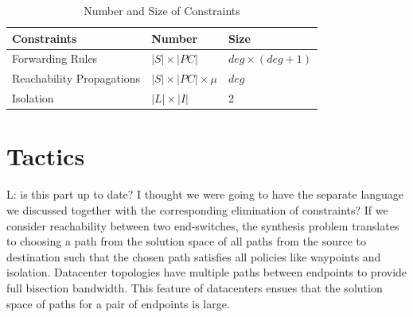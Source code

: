 \documentclass[]{sig}
\newcommand{\loris}[1]{\textcolor[rgb]{0.00,0.00,1.00}{L: #1}}
\begin{document}
\begin{table}[H]
\begin{center}
	\begin{tabular}{||m{6em} | m{7em} | m{7em} ||} 
		\hline
		Constraints & Number & Size \\ [0.5ex] 
		\hline\hline
		Forwarding Rules & $|S| \times |PC| $ & $deg \times (deg + 1)$ \\ [0.5ex] 
		\hline
		Reachability Propagations & $|S| \times |PC| \times \mu $ & $deg$ \\ [0.5ex] 
		\hline
		Isolation & $|L| \times |I|$ & 2 \\
		\hline
	\end{tabular}
\end{center}
\caption{Number and Size of Constraints} \label{tab:title} 
\end{table}

\section{Tactics} \label{sec:tactic}

\loris{is this part up to date?
I thought we were going to have the separate language we discussed
together with the corresponding elimination of constraints?
}
If we consider reachability between two end-switches, the synthesis problem translates to choosing a path from the solution space of all paths from the source to destination such that the chosen path satisfies all policies like waypoints and isolation. Datacenter topologies have multiple paths between endpoints to provide full bisection bandwidth. This feature of datacenters ensues that the solution space of paths for a pair of endpoints is large. 
\end{document}
